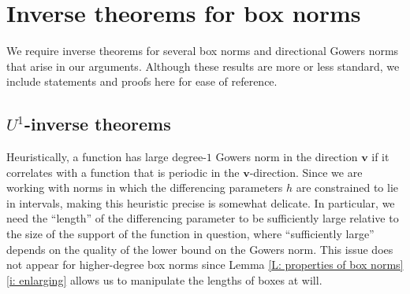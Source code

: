 \documentclass[11pt]{amsart}
\theoremstyle{definition}
\newcommand{\bv}{{\textbf{v}}}
\begin{document}
\appendix

\section{Inverse theorems for box norms}\label{A: inverse theorems}
We require inverse theorems for several box norms and directional Gowers norms that arise in our arguments.  Although these results are more or less standard, we include statements and proofs here for ease of reference.

\subsection{$U^1$-inverse theorems}
Heuristically, a function has large degree-$1$ Gowers norm in the direction $\bv$ if it correlates with a function that is periodic in the $\bv$-direction. Since we are working with norms in which the differencing parameters $h$ are constrained to lie in intervals, making this heuristic precise is somewhat delicate. In particular, we need the ``length'' of the differencing parameter to be sufficiently large relative to the size of the support of the function in question, where ``sufficiently large'' depends on the quality of the lower bound on the Gowers norm.
This issue does not appear for higher-degree box norms since Lemma \ref{L: properties of box norms}\eqref{i: enlarging} allows us to manipulate the lengths of boxes at will. 
\end{document}
